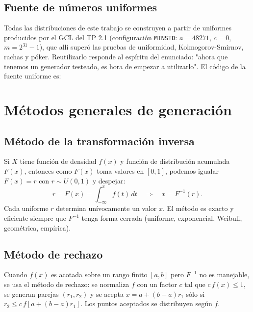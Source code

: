 \documentclass[11pt]{article}
\begin{document}
\subsection{Fuente de n\'umeros uniformes}

Todas las distribuciones de este trabajo se construyen a partir de uniformes
producidos por el GCL del TP 2.1 (configuraci\'on \texttt{MINSTD}:
$a = 48271$, $c = 0$, $m = 2^{31}-1$), que all\'i super\'o las pruebas de
uniformidad, Kolmogorov-Smirnov, rachas y p\'oker. Reutilizarlo responde al
esp\'iritu del enunciado: "ahora que tenemos un generador testeado, es hora
de empezar a utilizarlo". El c\'odigo de la fuente uniforme es:



\section{M\'etodos generales de generaci\'on}

\subsection{M\'etodo de la transformaci\'on inversa}

Si $X$ tiene funci\'on de densidad $f(x)$ y funci\'on de distribuci\'on
acumulada $F(x)$, entonces como $F(x)$ toma valores en $[0,1]$, podemos
igualar $F(x) = r$ con $r \sim U(0,1)$ y despejar:
\begin{equation}
r = F(x) = \int_{-\infty}^{x} f(t)\,dt
\quad\Longrightarrow\quad
x = F^{-1}(r).
\end{equation}
Cada uniforme $r$ determina un\'ivocamente un valor $x$. El m\'etodo es
exacto y eficiente siempre que $F^{-1}$ tenga forma cerrada (uniforme,
exponencial, Weibull, geom\'etrica, emp\'irica).

\subsection{M\'etodo de rechazo}

Cuando $f(x)$ es acotada sobre un rango finito $[a,b]$ pero $F^{-1}$ no es
manejable, se usa el m\'etodo de rechazo: se normaliza $f$ con un factor
$c$ tal que $c\,f(x)\le 1$, se generan parejas $(r_1, r_2)$ y se acepta
$x = a + (b-a)r_1$ s\'olo si $r_2 \le c\,f[a+(b-a)r_1]$. Los puntos
aceptados se distribuyen seg\'un $f$.
\end{document}
